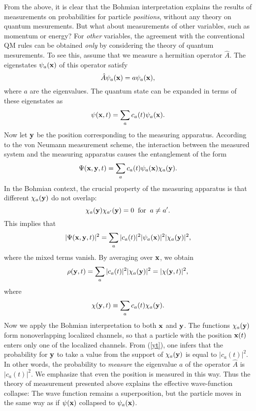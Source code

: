 \documentclass[10pt,twoside]{aipproc} %
\begin{document}
From the above, it is clear that the
Bohmian interpretation explains the results of measurements 
on probabilities for particle {\em positions}, without any 
theory on quantum mesurements. 
But what about measurements of other variables, such as 
momentum or energy? 
For {\em other} variables, the agreement with the conventional QM rules 
can be obtained {\em only} by considering the theory of quantum mesurements.
To see this, 
assume that we measure a hermitian operator $\hat{A}$. The eigenstates 
$\psi_a({\bf x})$ of this operator satisfy
\begin{equation}
\hat{A}\psi_a({\bf x})=a\psi_a({\bf x}) ,
\end{equation}
where $a$ are the eigenvalues.
The quantum state can be expanded in terms of these eigenstates as
\begin{equation}
\psi({\bf x},t)=\sum_a c_a(t)\psi_a({\bf x}) .
\end{equation}
Now let
${\bf y}$ be the position corresponding to the measuring apparatus.
According to the von Neumann measurement scheme, the interaction 
between the measured system and the measuring apparatus causes 
the entanglement of the form
\begin{equation}
\Psi({\bf x},{\bf y},t)=\sum_a c_a(t)\psi_a({\bf x})\chi_a({\bf y}) .
\end{equation}
In the Bohmian context, the crucial property
of the measuring apparatus is that different $\chi_a({\bf y})$ 
do not overlap:
\begin{equation}
\chi_a({\bf y})\chi_{a'}({\bf y})=0 \;\;{\rm for}\;\; a\neq a' .
\end{equation}
This implies that
\begin{equation}
|\Psi({\bf x},{\bf y},t)|^2=\sum_a |c_a(t)|^2 |\psi_a({\bf x})|^2 
|\chi_a({\bf y})|^2 ,
\end{equation}
where the mixed terms vanish.
By averaging over ${\bf x}$, we obtain
\begin{equation}\label{yt}
\rho({\bf y},t)=\sum_a |c_a(t)|^2 |\chi_a({\bf y})|^2=|\chi({\bf y},t)|^2 ,
\end{equation} 
where
\begin{equation}
\chi({\bf y},t)\equiv \sum_a c_a(t) \chi_a({\bf y}) .
\end{equation}
Now we apply the Bohmian interpretation to both ${\bf x}$ and ${\bf y}$.
The functions $\chi_a({\bf y})$ form nonoverlapping
localized channels, so that a
particle with the position ${\bf x}(t)$ 
enters only one of the localized channels.
From (\ref{yt}), one infers that the probability
for ${\bf y}$ to take a value from the support of $\chi_a({\bf y})$ is
equal to $|c_a(t)|^2$. 
In other words, the probability to {\em measure} the eigenvalue $a$ of the 
operator $\hat{A}$ is $|c_a(t)|^2$. 
We emphasize that even the position is measured in this way. 
Thus the theory of measurement presented above explains the
effective wave-function collapse: 
The wave function remains a superposition, but the particle moves 
in the same way as if $\psi({\bf x})$ collapsed to $\psi_a({\bf x})$. 
\end{document}
